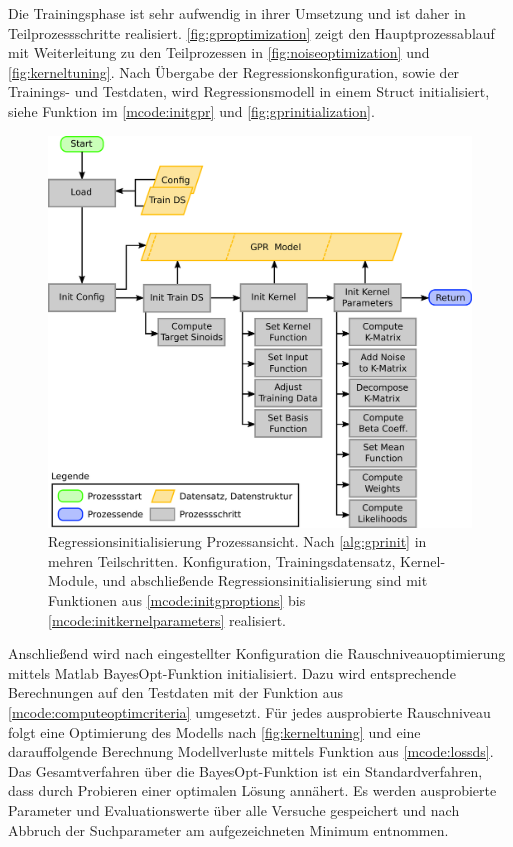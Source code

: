 \clearpage


Die Trainingsphase ist sehr aufwendig in ihrer Umsetzung und ist daher in Teilprozessschritte realisiert. \autoref{fig:gproptimization} zeigt den Hauptprozessablauf mit Weiterleitung zu den Teilprozessen in \autoref{fig:noiseoptimization} und \autoref{fig:kerneltuning}. Nach Übergabe der Regressionskonfiguration, sowie der Trainings- und Testdaten, wird Regressionsmodell in einem Struct initialisiert, siehe Funktion im \autoref{mcode:initgpr} und \autoref{fig:gprinitialization}.


\begin{figure}[hp]
	\centering
	\includegraphics[width=0.65\linewidth]{chapters/images/3-SW-E-OExp/GPR_Initialization}
	\caption[Regressionsinitialisierung Prozessansicht]{Regressionsinitialisierung Prozessansicht. Nach \autoref{alg:gprinit} in mehren Teilschritten. Konfiguration, Trainingsdatensatz, Kernel-Module, und abschließende Regressionsinitialisierung sind mit Funktionen aus \autoref{mcode:initgproptions} bis \autoref{mcode:initkernelparameters} realisiert.}
	\label{fig:gprinitialization}
\end{figure}


Anschließend wird nach eingestellter Konfiguration die Rauschniveauoptimierung mittels Matlab BayesOpt-Funktion initialisiert. Dazu wird entsprechende Berechnungen auf den Testdaten mit der Funktion aus \autoref{mcode:computeoptimcriteria} umgesetzt. Für jedes ausprobierte Rauschniveau folgt eine Optimierung des Modells nach \autoref{fig:kerneltuning} und eine darauffolgende  Berechnung Modellverluste mittels Funktion aus \autoref{mcode:lossds}. Das Gesamtverfahren über die BayesOpt-Funktion ist ein Standardverfahren, dass durch Probieren einer optimalen Lösung annähert. Es werden ausprobierte Parameter und Evaluationswerte über alle Versuche gespeichert und nach Abbruch der Suchparameter am aufgezeichneten Minimum entnommen.


